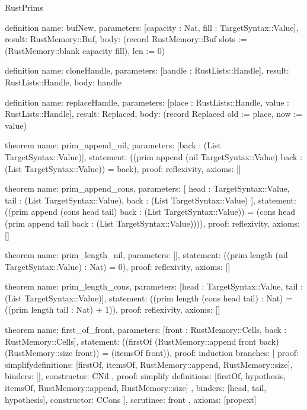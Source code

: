 \begin{lexlean}{RustPrims}
\begin{semanticmodule}
definition{
  name: bufNew,
  parameters: [capacity : Nat, fill : TargetSyntax::Value],
  result: RustMemory::Buf,
  body: (record RustMemory::Buf {slots := (RustMemory::blank capacity fill), len := 0})
}

definition{
  name: cloneHandle,
  parameters: [handle : RustLists::Handle],
  result: RustLists::Handle,
  body: handle
}

definition{
  name: replaceHandle,
  parameters: [place : RustLists::Handle, value : RustLists::Handle],
  result: Replaced,
  body: (record Replaced {old := place, now := value})
}

theorem{
  name: prim_append_nil,
  parameters: [back : (List TargetSyntax::Value)],
  statement: ((prim append (nil TargetSyntax::Value) back : (List TargetSyntax::Value)) = back),
  proof: reflexivity{},
  axioms: []
}

theorem{
  name: prim_append_cons,
  parameters: [
    head : TargetSyntax::Value,
    tail : (List TargetSyntax::Value),
    back : (List TargetSyntax::Value)
  ],
  statement: ((prim append (cons head tail) back : (List TargetSyntax::Value)) = (cons head (prim append tail back : (List TargetSyntax::Value)))),
  proof: reflexivity{},
  axioms: []
}

theorem{
  name: prim_length_nil,
  parameters: [],
  statement: ((prim length (nil TargetSyntax::Value) : Nat) = 0),
  proof: reflexivity{},
  axioms: []
}

theorem{
  name: prim_length_cons,
  parameters: [head : TargetSyntax::Value, tail : (List TargetSyntax::Value)],
  statement: ((prim length (cons head tail) : Nat) = ((prim length tail : Nat) + 1)),
  proof: reflexivity{},
  axioms: []
}

theorem{
  name: first_of_front,
  parameters: [front : RustMemory::Cells, back : RustMemory::Cells],
  statement: ((firstOf (RustMemory::append front back) (RustMemory::size front)) = (itemsOf front)),
  proof: induction{
    branches: [
      {
        proof: simplify{definitions: [firstOf, itemsOf, RustMemory::append, RustMemory::size]},
        binders: [],
        constructor: CNil
      },
      {
        proof: simplify{
          definitions: [firstOf, hypothesis, itemsOf, RustMemory::append, RustMemory::size]
        },
        binders: [head, tail, hypothesis],
        constructor: CCons
      }
    ],
    scrutinee: front
  },
  axioms: [propext]
}


\end{semanticmodule}
\end{lexlean}
